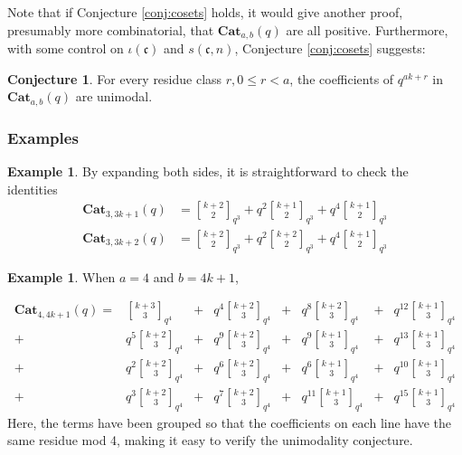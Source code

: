 \documentclass{amsart}[12pt]
\theoremstyle{definition}
\newtheorem{example}[dummy]{Example}
\newtheorem{conjecture}[dummy]{Conjecture}
\newcommand{\Cat}{\mathbf{Cat}}
\begin{document}
Note that if Conjecture \ref{conj:cosets} holds, it would give
another proof, presumably more combinatorial, that $\Cat_{a,b}(q)$ are all positive.  Furthermore, with some control on $\iota(\mathfrak{c})$ and $s(\mathfrak{c},n)$, Conjecture \ref{conj:cosets} suggests:

\begin{conjecture}
For every residue class $r, 0\leq r< a$, the coefficients of $q^{ak+r}$ in $\Cat_{a,b}(q)$ are unimodal.
\end{conjecture}

\subsubsection{Examples}

\begin{example}
By expanding both sides, it is straightforward to check the identities
\begin{align*}
\Cat_{3,3k+1}(q) & ={k+2\brack 2}_{q^3}
+q^2{k+1 \brack 2}_{q^3}
+q^4{k+1\brack 2}_{q^3} \\
\Cat_{3,3k+2}(q)&=
{k+2\brack 2}_{q^3}
+q^2{k+2\brack 2}_{q^3}
+q^4{k+1\brack 2}_{q^3}
\end{align*}
\end{example}

\begin{example}
When $a=4$ and $b=4k+1$,

\begin{align*}
\Cat_{4, 4k+1}(q)=&
{k+3\brack 3}_{q^4}&+&q^4{k+2\brack 3}_{q^4}&+&q^8{k+2\brack 3}_{q^4}&+&q^{12}{k+1\brack 3}_{q^4} \\
+&q^5{k+2\brack 3}_{q^4}&+&q^9{k+2\brack 3}_{q^4}&+&q^9{k+1\brack 3}_{q^4}&+&q^{13}{k+1\brack 3}_{q^4} \\
+&q^2{k+2\brack 3}_{q^4}&+&q^6{k+2\brack 3}_{q^4}&+&q^6{k+1\brack 3}_{q^4}&+&q^{10}{k+1\brack 3}_{q^4}\\
+&q^3{k+2\brack 3}_{q^4}&+&q^7{k+2\brack 3}_{q^4}&+&q^{11}{k+1\brack 3}_{q^4}&+&q^{15}{k+1\brack 3}_{q^4}
\end{align*}
Here, the terms have been grouped so that the coefficients on each line have the same residue mod 4, making it easy to verify the unimodality conjecture.







\end{example}
\end{document}
